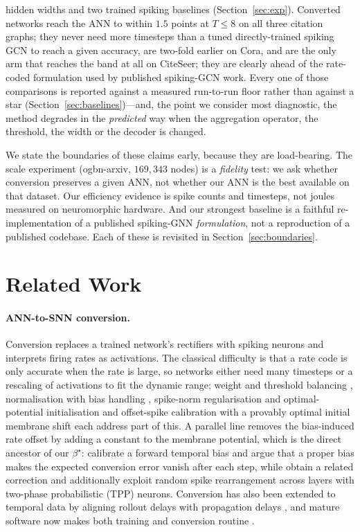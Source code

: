 \documentclass[10pt,twocolumn]{article}
\newcommand{\betastar}{\beta^{\star}}
\newcommand{\secref}[1]{Section~\ref{#1}}
\begin{document}
\begin{enumerate}
hidden widths and two trained spiking baselines (\secref{sec:exp}). Converted networks reach the ANN
to within $1.5$ points at $T \le 8$ on all three citation graphs; they never need more timesteps than
a tuned directly-trained spiking GCN to reach a given accuracy, are two-fold earlier on Cora, and are
the only arm that reaches the band at all on CiteSeer; they are clearly ahead of the rate-coded
formulation used by published spiking-GCN work. Every one of those comparisons is reported against a
measured run-to-run floor rather than against a star (\secref{sec:baselines})---and, the point we
consider most diagnostic, the method degrades in the \emph{predicted} way when the aggregation
operator, the threshold, the width or the decoder is changed.
\end{enumerate}

We state the boundaries of these claims early, because they are load-bearing. The scale experiment
(ogbn-arxiv, $169{,}343$ nodes) is a \emph{fidelity} test: we ask whether conversion preserves a
given ANN, not whether our ANN is the best available on that dataset. Our efficiency evidence is
spike counts and timesteps, not joules measured on neuromorphic hardware. And our strongest baseline
is a faithful re-implementation of a published spiking-GNN \emph{formulation}, not a reproduction of
a published codebase. Each of these is revisited in \secref{sec:boundaries}.
\section{Related Work}
\label{sec:related}

\paragraph{ANN-to-SNN conversion.}
Conversion replaces a trained network's rectifiers with spiking neurons and interprets firing rates
as activations. The classical difficulty is that a rate code is only accurate when the rate is
large, so networks either need many timesteps or a rescaling of activations to fit the dynamic
range; weight and threshold balancing \citep{diehl2015fast}, normalisation with bias handling
\citep{rueckauer2017conversion}, spike-norm regularisation \citep{sengupta2019going} and
optimal-potential initialisation \citep{bu2022optimal,deng2021optimal} and offset-spike calibration
with a provably optimal initial membrane shift \citep{hao2023offset} each address part of this.
A parallel line removes the bias-induced rate offset by adding a constant to the membrane potential,
which is the direct ancestor of our $\betastar$: \citet{wu2024ftbc} calibrate a forward temporal bias
and argue that a proper bias makes the expected conversion error vanish after each step, while
\citet{bojkovic2025temporal} obtain a related correction and additionally exploit random spike
rearrangement across layers with two-phase probabilistic (TPP) neurons. Conversion has also been
extended to temporal data by aligning rollout delays with propagation delays
\citep{kugele2020efficient}, and mature software now makes both training and conversion routine
\citep{fang2023spikingjelly}.
\end{document}
